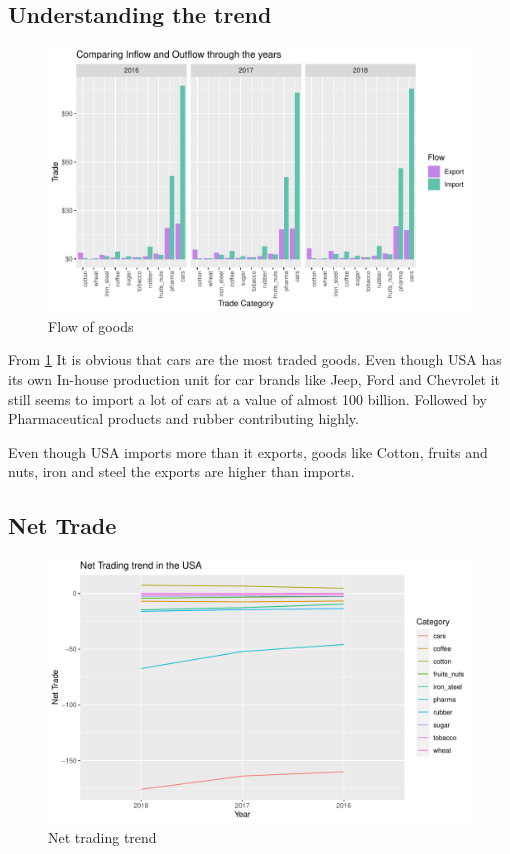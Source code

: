 \documentclass[11pt,a4paper,]{article}
\begin{document}
\hypertarget{understanding-the-trend}{%
\subsection{Understanding the trend}\label{understanding-the-trend}}

\begin{figure}[H]
\includegraphics[width=1\linewidth,]{report_files/figure-latex/plot1-1} \caption{Flow of goods}\label{fig:plot1}
\end{figure}

From \ref{fig:plot1} It is obvious that cars are the most traded goods. Even though USA has its own In-house production unit for car brands like Jeep, Ford and Chevrolet it still seems to import a lot of cars at a value of almost 100 billion. Followed by Pharmaceutical products and rubber contributing highly.

Even though USA imports more than it exports, goods like Cotton, fruits and nuts, iron and steel the exports are higher than imports.

\hypertarget{net-trade}{%
\subsection{Net Trade}\label{net-trade}}

\begin{figure}[H]
\includegraphics[width=1\linewidth,]{report_files/figure-latex/plot2-1} \caption{Net trading trend}\label{fig:plot2}
\end{figure}
\end{document}
